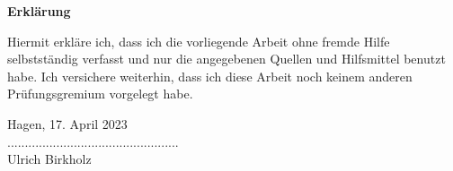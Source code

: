 \begin{center}
\Large{\textsf{\textbf{Erklärung}}}
\end{center}
\vspace{0.8cm}
Hiermit erkläre ich, dass ich die vorliegende Arbeit ohne fremde Hilfe selbstständig
verfasst und nur die angegebenen Quellen und Hilfsmittel benutzt habe. Ich versichere
weiterhin, dass ich diese Arbeit noch keinem anderen Prüfungsgremium vorgelegt habe.

Hagen, 17. April 2023
\\[1cm]
.................................................\\[0.2cm]
Ulrich Birkholz